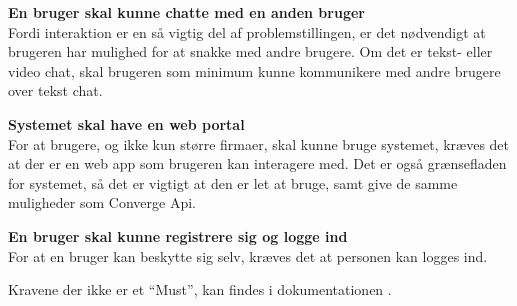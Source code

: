 \textbf{En bruger skal kunne chatte med en anden bruger} \\
Fordi interaktion er en så vigtig del af problemstillingen, er det nødvendigt at brugeren har mulighed for at snakke med andre brugere. Om det er tekst- eller video chat, skal brugeren som minimum kunne kommunikere med andre brugere over tekst chat.

\textbf{Systemet skal have en web portal} \\
For at brugere, og ikke kun større firmaer, skal kunne bruge systemet, kræves det at der er en web app som brugeren kan interagere med. Det er også grænsefladen for systemet, så det er vigtigt at den er let at bruge, samt give de samme muligheder som Converge Api.

\textbf{En bruger skal kunne registrere sig og logge ind} \\
For at en bruger kan beskytte sig selv, kræves det at personen kan logges ind.

Kravene der ikke er et “Must”, kan findes i dokumentationen \cite{documentation-kravspec}. 
